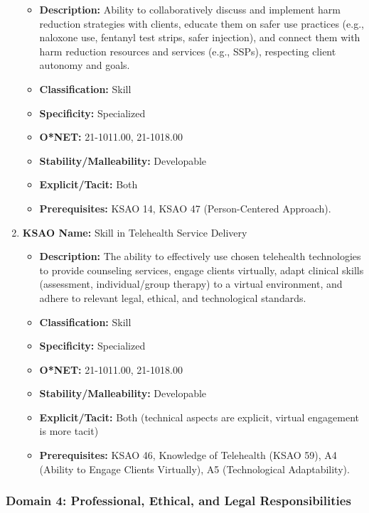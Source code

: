 \documentclass[
  letterpaper,
  DIV=11,
  numbers=noendperiod]{scrartcl}
\providecommand{\tightlist}{%
  \setlength{\itemsep}{0pt}\setlength{\parskip}{0pt}}
\begin{document}
\begin{enumerate}
  \begin{itemize}
  \tightlist
  \item
    \textbf{Description:} Ability to collaboratively discuss and
    implement harm reduction strategies with clients, educate them on
    safer use practices (e.g., naloxone use, fentanyl test strips, safer
    injection), and connect them with harm reduction resources and
    services (e.g., SSPs), respecting client autonomy and goals.
  \item
    \textbf{Classification:} Skill
  \item
    \textbf{Specificity:} Specialized
  \item
    \textbf{O*NET:} 21-1011.00, 21-1018.00
  \item
    \textbf{Stability/Malleability:} Developable
  \item
    \textbf{Explicit/Tacit:} Both
  \item
    \textbf{Prerequisites:} KSAO 14, KSAO 47 (Person-Centered Approach).
  \end{itemize}
\item
  \textbf{KSAO Name:} Skill in Telehealth Service Delivery

  \begin{itemize}
  \tightlist
  \item
    \textbf{Description:} The ability to effectively use chosen
    telehealth technologies to provide counseling services, engage
    clients virtually, adapt clinical skills (assessment,
    individual/group therapy) to a virtual environment, and adhere to
    relevant legal, ethical, and technological standards.
  \item
    \textbf{Classification:} Skill
  \item
    \textbf{Specificity:} Specialized
  \item
    \textbf{O*NET:} 21-1011.00, 21-1018.00
  \item
    \textbf{Stability/Malleability:} Developable
  \item
    \textbf{Explicit/Tacit:} Both (technical aspects are explicit,
    virtual engagement is more tacit)
  \item
    \textbf{Prerequisites:} KSAO 46, Knowledge of Telehealth (KSAO 59),
    A4 (Ability to Engage Clients Virtually), A5 (Technological
    Adaptability).
  \end{itemize}
\end{enumerate}

\subsubsection{Domain 4: Professional, Ethical, and Legal
Responsibilities}\label{domain-4-professional-ethical-and-legal-responsibilities}
\end{document}
